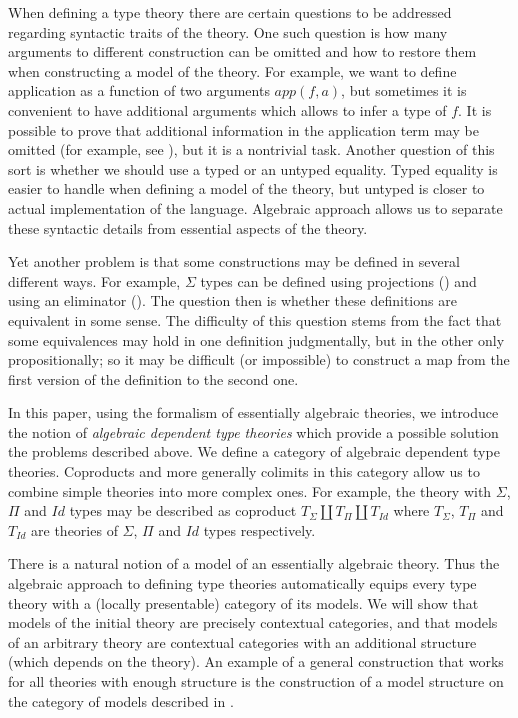 \documentclass[reqno]{amsart}
\theoremstyle{definition}
\theoremstyle{remark}
\numberwithin{figure}{section}
\begin{document}
When defining a type theory there are certain questions to be addressed regarding syntactic traits of the theory.
One such question is how many arguments to different construction can be omitted and how to restore them when constructing a model of the theory.
For example, we want to define application as a function of two arguments $app(f,a)$, but sometimes it is convenient to have additional arguments which allows to infer a type of $f$.
It is possible to prove that additional information in the application term may be omitted (for example, see \cite{streicher}), but it is a nontrivial task.
Another question of this sort is whether we should use a typed or an untyped equality.
Typed equality is easier to handle when defining a model of the theory, but untyped is closer to actual implementation of the language.
Algebraic approach allows us to separate these syntactic details from essential aspects of the theory.

Yet another problem is that some constructions may be defined in several different ways.
For example, $\Sigma$ types can be defined using projections () and using an eliminator ().
The question then is whether these definitions are equivalent in some sense.
The difficulty of this question stems from the fact that some equivalences may hold in one definition judgmentally, but in the other only propositionally;
so it may be difficult (or impossible) to construct a map from the first version of the definition to the second one.

In this paper, using the formalism of essentially algebraic theories, we introduce the notion of
\emph{algebraic dependent type theories} which provide a possible solution the problems described above.
We define a category of algebraic dependent type theories.
Coproducts and more generally colimits in this category allow us to combine simple theories into more complex ones.
For example, the theory with $\Sigma$, $\Pi$ and $Id$ types may be described as coproduct $T_\Sigma \amalg T_\Pi \amalg T_{Id}$
where $T_\Sigma$, $T_\Pi$ and $T_{Id}$ are theories of $\Sigma$, $\Pi$ and $Id$ types respectively.

There is a natural notion of a model of an essentially algebraic theory.
Thus the algebraic approach to defining type theories automatically equips every type theory with a (locally presentable) category of its models.
We will show that models of the initial theory are precisely contextual categories,
and that models of an arbitrary theory are contextual categories with an additional structure (which depends on the theory).
An example of a general construction that works for all theories with enough structure is the construction of a model structure on the category of models described in \cite{alg-models}.
\end{document}
